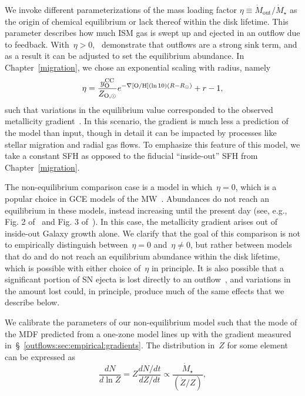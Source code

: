 We invoke different parameterizations of the mass loading factor
$\eta \equiv \dot{M}_\text{out} / \dot{M}_\star$ as the origin of chemical
equilibrium or lack thereof within the disk lifetime.
This parameter describes how much ISM gas is swept up and ejected in an outflow
due to feedback.
With~$\eta > 0$,~\citet{Weinberg2017b} demonstrate that outflows are a strong
sink term, and as a result it can be adjusted to set the equilibrium abundance.
In Chapter~\ref{migration}, we chose an exponential scaling with radius, namely
\begin{equation}
\eta = \frac{y_\text{O}^\text{CC}}{Z_{\text{O},\odot}}
e^{-\nabla\text{[O/H]} (\ln 10) (R - R_\odot)} + r - 1,
\end{equation}
such that variations in the equilibrium value corresponded to the observed
metallicity gradient~.
In this scenario, the gradient is much less a prediction of the model than
input, though in detail it can be impacted by processes like stellar migration
and radial gas flows.
To emphasize this feature of this model, we take a constant SFH as opposed to
the fiducial ``inside-out'' SFH from Chapter~\ref{migration}.
\par
The non-equilibrium comparison case is a model in which~$\eta = 0$, which is a
popular choice in GCE models of the MW~\citep[e.g.,][]{Minchev2013,
Minchev2014, Spitoni2019, Spitoni2021}.
Abundances do not reach an equilibrium in these models, instead increasing
until the present day (see, e.g., Fig. 2 of~\citealt{Minchev2013} and Fig. 3
of~\citealt{Spitoni2021}).
In this case, the metallicity gradient arises out of inside-out Galaxy growth
alone.
We clarify that the goal of this comparison is not to empirically distinguish
between~$\eta = 0$ and~$\eta \neq 0$, but rather between models that do and do
not reach an equilibrium abundance within the disk lifetime, which is possible
with either choice of~$\eta$ in principle.
It is also possible that a significant portion of SN ejecta is lost directly to
an outflow~\citep{Dalcanton2007, Peeples2011, Christensen2018, Chisholm2018,
Cameron2021}, and variations in the amount lost could, in principle, produce
much of the same effects that we describe below.
\par
We calibrate the parameters of our non-equilibrium model such that the mode of
the MDF predicted from a one-zone model lines up with the gradient measured
in~\S~\ref{outflows:sec:empirical:gradients}.
The distribution in~$Z$ for some element can be expressed as
\begin{equation}
\frac{dN}{d \ln Z} = Z \frac{dN / dt}{dZ / dt}
\propto \frac{\dot{M}_\star}{(\dot{Z} / Z)},
\end{equation}

